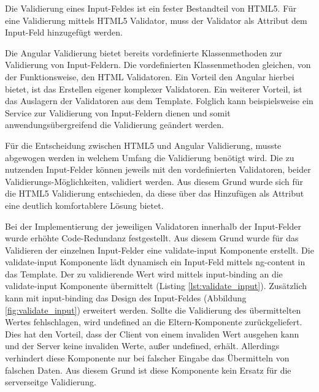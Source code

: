 \begin{description}
	Die Validierung eines Input-Feldes ist ein fester Bestandteil von \gls{HTML}5. Für eine Validierung mittels \gls{HTML}5 Validator, muss der Validator als Attribut dem Input-Feld hinzugefügt werden.

	Die Angular Validierung bietet bereits vordefinierte Klassenmethoden zur Validierung von Input-Feldern. Die vordefinierten Klassenmethoden gleichen, von der Funktionsweise, den HTML Validatoren. Ein Vorteil den Angular hierbei bietet, ist das Erstellen eigener komplexer Validatoren. Ein weiterer Vorteil, ist das Auslagern der Validatoren aus dem Template. Folglich kann beispielsweise ein Service zur Validierung von Input-Feldern dienen und somit anwendungsübergreifend die Validierung geändert werden.

	Für die Entscheidung zwischen \gls{HTML}5 und Angular Validierung, musste abgewogen werden in welchem Umfang die Validierung benötigt wird. Die zu nutzenden Input-Felder können jeweils mit den vordefinierten Validatoren, beider Validierungs-Möglichkeiten, validiert werden. Aus diesem Grund wurde sich für die \gls{HTML}5 Validierung entschieden, da diese über das Hinzufügen als Attribut eine deutlich komfortablere Lösung bietet.

		Bei der Implementierung der jeweiligen Validatoren innerhalb der Input-Felder wurde erhöhte Code-Redundanz festgestellt. Aus diesem Grund wurde für das Validieren der einzelnen Input-Felder eine validate-input Komponente erstellt. Die validate-input Komponente lädt dynamisch ein Input-Feld mittels ng-content in das Template. Der zu validierende Wert wird mittels input-binding an die validate-input Komponente übermittelt (Listing \ref{lst:validate_input}). Zusätzlich kann mit input-binding das Design des Input-Feldes (Abbildung \ref{fig:validate_input}) erweitert werden. Sollte die Validierung des übermittelten Wertes fehlschlagen, wird undefined an die Eltern-Komponente zurückgeliefert. Dies hat den Vorteil, dass der Client von einem invaliden Wert ausgehen kann und der Server keine invaliden Werte, au{\ss}er undefined, erhält. Allerdings verhindert diese Komponente nur bei falscher Eingabe das Übermitteln von falschen Daten. Aus diesem Grund ist diese Komponente kein Ersatz für die serverseitge Validierung.


\end{description}
